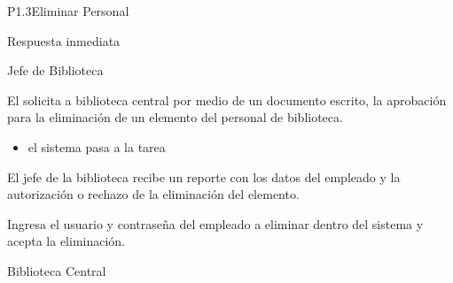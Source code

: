 \begin{Proceso}{P1.3}{Eliminar Personal}
   { %
  }

   { %
    \begin{UClist}
      \UCli Respuesta inmediata
      
    \end{UClist}
  }
   { %

  }

\end{Proceso}

\begin{PDescripcion}

  \Ppaso Jefe de Biblioteca

    \begin{enumerate}

      \Ppaso[\itarea] El  solicita a biblioteca central por medio de un documento escrito, la aprobación para la eliminación de un elemento del personal de biblioteca. 

  \begin{itemize}
    \item {} el sistema pasa a la tarea 
  \end{itemize}

\Ppaso[\itarea] El jefe de la biblioteca recibe un reporte con los datos del empleado y la autorización o rechazo de la eliminación del elemento.

\Ppaso[\itarea] Ingresa el usuario y contraseña del empleado a eliminar dentro del sistema y acepta la eliminación.

    \end{enumerate}
    
  \Ppaso Biblioteca Central

    \begin{enumerate}


\end{enumerate}
\end{PDescripcion}
